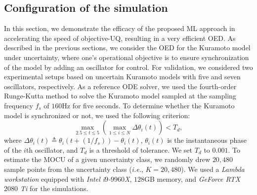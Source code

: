 \documentclass{article}
\begin{document}
\subsection{Configuration of the simulation}
In this section, we demonstrate the efficacy of the proposed ML approach in accelerating the speed of objective-UQ, resulting in a very efficient OED. As described in the previous sections, we consider the OED for the Kuramoto model under uncertainty, where one's operational objective is to ensure synchronization of the model by adding an oscillator for control. For validation, we considered two experimental setups based on uncertain Kuramoto models with five and seven oscillators, respectively. As a reference ODE solver, we used the fourth-order Runge-Kutta method to solve the Kuramoto model sampled at the sampling frequency ${f_s}$ of ${160}$Hz for five seconds. To determine whether the Kuramoto model is synchronized or not, we used the following criterion: 
\begin{equation}
    \max_{2.5\leq t\leq 5} ( \max_{1\leq i \leq N} \Delta \theta_i \left(t\right)) < T_d,\label{syncCriterion}
\end{equation}
where ${\Delta \theta_i \left(t\right) \triangleq \theta_i \left(t + ({1}/{f_s})\right) - \theta_i \left(t\right)}$, ${\theta_i\left(t\right)}$ is the instantaneous phase of the ${i}$th oscillator, and ${T_d}$ is a threshold of tolerance. We set ${T_d}$ to ${0.001}$. To estimate the MOCU of a given uncertainty class, we randomly drew $20,480$ sample points from the uncertainty class (\textit{i.e.}, ${K = 20,480}$). We used a \textit{Lambda workstation} equipped with \textit{Intel i$9$-$9960$X}, $128$GB memory, and \textit{GeForce RTX $2080$ Ti} for the simulations.
\end{document}

